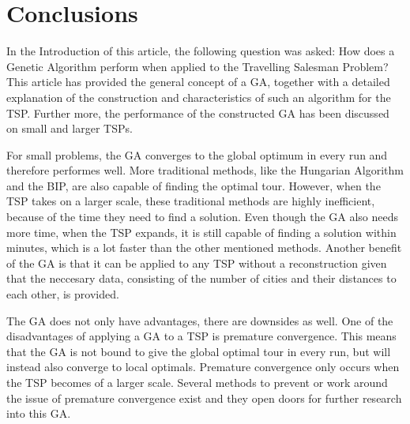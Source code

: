 \chapter{Conclusions}
\par
In the Introduction of this article, the following question was asked: How does a Genetic Algorithm perform when applied to the Travelling Salesman Problem?
This article has provided the general concept of a GA, together with a detailed explanation of the construction and characteristics of such an algorithm for the TSP. Further more, the performance of the constructed GA has been discussed on small and larger TSPs. 

\par
For small problems, the GA converges to the global optimum in every run and therefore performes well. More traditional methods, like the Hungarian Algorithm and the BIP, are also capable of finding the optimal tour. However, when the TSP takes on a larger scale, these traditional methods are highly inefficient, because of the time they need to find a solution. Even though the GA also needs more time, when the TSP expands, it is still capable of finding a solution within minutes, which is a lot faster than the other mentioned methods. Another benefit of the GA is that it can be applied to any TSP without a reconstruction given that the neccesary data, consisting of the number of cities and their distances to each other, is provided. 

\par
The GA does not only have advantages, there are downsides as well. One of the disadvantages of applying a GA to a TSP is premature convergence. This means that the GA is not bound to give the global optimal tour in every run, but will instead also converge to local optimals. Premature convergence only occurs when the TSP becomes of a larger scale. Several methods to prevent or work around the issue of premature convergence exist \cite{Premconvergence} and they open doors for further research into this GA. 

